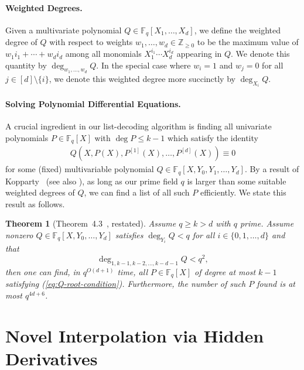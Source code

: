 \documentclass[11pt]{article}
\newtheorem{theorem}{Theorem}[section]
\newcommand{\F}{\mathbb F}
\begin{document}
\paragraph{Weighted Degrees.}

Given a multivariate polynomial $Q \in \F_q[X_1, \hdots, X_d]$, we define the weighted degree of $Q$ with respect to weights $w_1, \hdots, w_d \in \mathbb Z_{\ge 0}$ to be the maximum value of $w_1i_1 + \cdots + w_di_d$ among all monomials $X_1^{i_1} \cdots X_d^{i_d}$ appearing in $Q$. We denote this quantity by $\deg_{w_1, \hdots, w_d} Q$. In the special case where $w_i = 1$ and $w_j = 0$ for all $j \in [d] \setminus \{i\}$, we denote this weighted degree more succinctly by $\deg_{X_i} Q$.

\paragraph{Solving Polynomial Differential Equations.}

A crucial ingredient in our list-decoding algorithm is finding all univariate polynomials $P \in \F_q[X]$ with $\deg P \le k-1$ which satisfy the identity
\begin{align}
    Q(X, P(X), P^{[1]}(X), \hdots, P^{[d]}(X)) \equiv 0\label{eq:Q-root-condition}
\end{align}
for some (fixed) multivariable polynomial $Q \in \F_q[X, Y_0, Y_1, \hdots, Y_d]$. By a result of Kopparty~\cite{Kopparty2015} (see also \cite{KT22}), as long as our prime field $q$ is larger than some suitable weighted degrees of $Q$, we can find a list of all such $P$ efficiently. We state this result as follows.

\begin{theorem}[Theorem~4.3~\cite{Kopparty2015}, restated]\label{thm:root-finding}
Assume $q \ge k > d$ with $q$ prime. Assume nonzero $Q \in \F_q[X, Y_0, \hdots, Y_d]$ satisfies $\deg_{Y_i} Q < q$ for all $i \in \{0,1,\hdots, d\}$ and that
\[
    \deg_{1,k-1,k-2, \hdots, k-d-1} Q < q^2,
\]
then one can find, in $q^{O(d+1)}$ time, all $P \in \F_q[X]$ of degree at most $k-1$ satisfying (\ref{eq:Q-root-condition}). Furthermore, the number of such $P$ found is at most $q^{4d+6}$.
\end{theorem}

\section{Novel Interpolation via Hidden Derivatives}\label{sec:interpolation}
\end{document}
